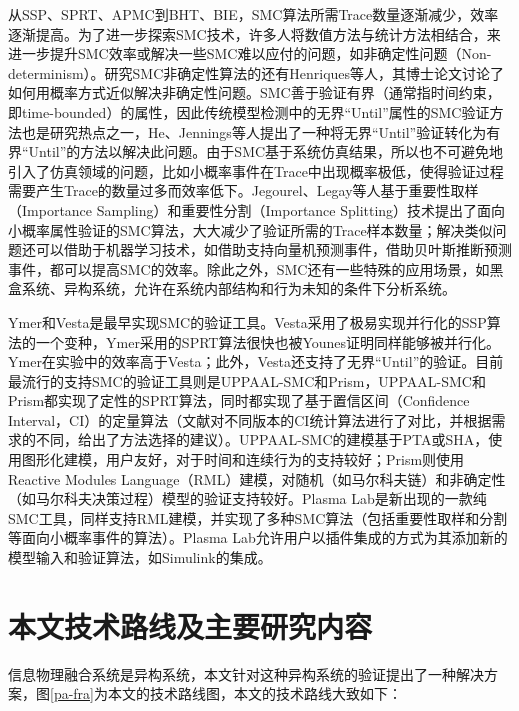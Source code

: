 从SSP、SPRT、APMC到BHT、BIE，SMC算法所需Trace数量逐渐减少，效率逐渐提高。为了进一步探索SMC技术，许多人将数值方法与统计方法相结合\cite{bogdoll2011partial,pavese2013automated}，来进一步提升SMC效率或解决一些SMC难以应付的问题，如非确定性问题（Non-determinism）。研究SMC非确定性算法的还有Henriques等人，其博士论文讨论了如何用概率方式近似解决非确定性问题\cite{henriques2012statistical}。SMC善于验证有界（通常指时间约束，即time-bounded）的属性，因此传统模型检测中的无界“Until”属性的SMC验证方法也是研究热点之一，He、Jennings等人提出了一种将无界“Until”验证转化为有界“Until”的方法以解决此问题\cite{he2010bounded,jennings2012two}。由于SMC基于系统仿真结果，所以也不可避免地引入了仿真领域的问题，比如小概率事件在Trace中出现概率极低，使得验证过程需要产生Trace的数量过多而效率低下。Jegourel、Legay等人基于重要性取样（Importance Sampling）和重要性分割（Importance Splitting）技术提出了面向小概率属性验证的SMC算法\cite{jegourel2012cross,jegourel2013importance}，大大减少了验证所需的Trace样本数量；解决类似问题还可以借助于机器学习技术，如\cite{du2015smc4rare}借助支持向量机预测事件，\cite{kumar2014efficient}借助贝叶斯推断预测事件，都可以提高SMC的效率。除此之外，SMC还有一些特殊的应用场景，如黑盒系统\cite{sen2004statistical}、异构系统\cite{basu2010statistical,vodenvcarevic2012learning}，允许在系统内部结构和行为未知的条件下分析系统。

Ymer\cite{younes2005ymer}和Vesta\cite{sen2005vesta}是最早实现SMC的验证工具。Vesta采用了极易实现并行化的SSP算法的一个变种，Ymer采用的SPRT算法很快也被Younes证明同样能够被并行化。Ymer在实验中的效率高于Vesta；此外，Vesta还支持了无界“Until”的验证。目前最流行的支持SMC的验证工具则是UPPAAL-SMC\cite{bulychev2012uppaal}和Prism\cite{kwiatkowska2011prism}，UPPAAL-SMC和Prism都实现了定性的SPRT算法，同时都实现了基于置信区间（Confidence Interval，CI）\cite{brown2001interval}的定量算法（文献\cite{pires2008interval}对不同版本的CI统计算法进行了对比，并根据需求的不同，给出了方法选择的建议）。UPPAAL-SMC的建模基于PTA或SHA，使用图形化建模，用户友好，对于时间和连续行为的支持较好；Prism则使用Reactive Modules Language（RML）建模，对随机（如马尔科夫链）和非确定性（如马尔科夫决策过程）模型的验证支持较好。Plasma Lab\cite{boyer2013plasma}是新出现的一款纯SMC工具，同样支持RML建模，并实现了多种SMC算法（包括重要性取样和分割等面向小概率事件的算法）。Plasma Lab允许用户以插件集成的方式为其添加新的模型输入和验证算法，如Simulink的集成。

\section{本文技术路线及主要研究内容}
信息物理融合系统是异构系统，本文针对这种异构系统的验证提出了一种解决方案，图\ref{pa-fra}为本文的技术路线图，本文的技术路线大致如下：

